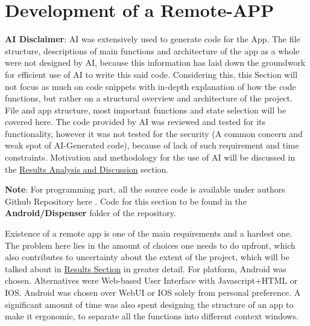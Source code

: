 \section{Development of a Remote-APP}\label{sec:FrontendDev}
\textbf{AI Disclaimer}: AI was extensively used to generate  code for the App. The file structure, descriptions of main functions and architecture of the app as a whole were not designed by AI, because this information has laid down the groundwork for efficient use of AI to write this said code. Considering this, this Section will not focus as much on code snippets with in-depth explanation of how the code functions, but rather on a structural overview and architecture of the project. File and app structure, most important functions and state selection will be covered here. The code provided by AI was reviewed and tested for its functionality, however it was not tested for the security (A common concern and weak spot of AI-Generated code), because of lack of such requirement and time constraints. Motivation and methodology for the use of AI will be discussed in the \hyperref[sec:discussion]{Results Analysis and Discussion} section.

\textbf{Note}: For programming part, all the source code is available under authors Github Repository here \cite{Github_src}. Code for this section to be found in the \textbf{Android/Dispenser} folder of the repository.

Existence of a remote app is one of the main requirements and a hardest one. The problem here lies in the amount of choices one needs to do upfront, which also contributes to uncertainty about the extent of the project, which will be talked about in \hyperref[sec:discussion]{Results Section} in greater detail. For platform, Android was chosen. Alternatives were Web-based User Interface with Javascript+HTML or IOS. Android was chosen over WebUI or IOS solely from personal preference. A significant amount of time was also spent designing the structure of an app to make it ergonomic, to separate all the functions into different context windows.

